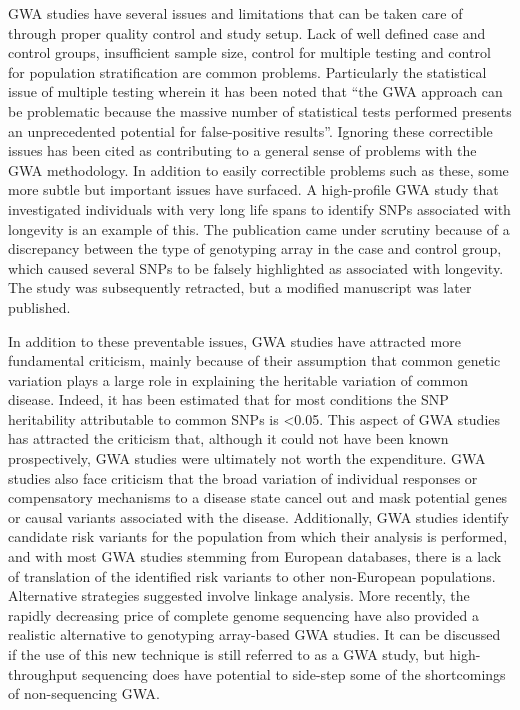 GWA studies have several issues and limitations that can be taken care of through proper quality control and study setup. Lack of well defined case and control groups, insufficient sample size, control for multiple testing and control for population stratification are common problems. Particularly the statistical issue of multiple testing wherein it has been noted that ``the GWA approach can be problematic because the massive number of statistical tests performed presents an unprecedented potential for false-positive results''. Ignoring these correctible issues has been cited as contributing to a general sense of problems with the GWA methodology. In addition to easily correctible problems such as these, some more subtle but important issues have surfaced. A high-profile GWA study that investigated individuals with very long life spans to identify SNPs associated with longevity is an example of this. The publication came under scrutiny because of a discrepancy between the type of genotyping array in the case and control group, which caused several SNPs to be falsely highlighted as associated with longevity. The study was subsequently retracted, but a modified manuscript was later published.

In addition to these preventable issues, GWA studies have attracted more fundamental criticism, mainly because of their assumption that common genetic variation plays a large role in explaining the heritable variation of common disease. Indeed, it has been estimated that for most conditions the SNP heritability attributable to common SNPs is \textless{}0.05. This aspect of GWA studies has attracted the criticism that, although it could not have been known prospectively, GWA studies were ultimately not worth the expenditure. GWA studies also face criticism that the broad variation of individual responses or compensatory mechanisms to a disease state cancel out and mask potential genes or causal variants associated with the disease. Additionally, GWA studies identify candidate risk variants for the population from which their analysis is performed, and with most GWA studies stemming from European databases, there is a lack of translation of the identified risk variants to other non-European populations. Alternative strategies suggested involve linkage analysis. More recently, the rapidly decreasing price of complete genome sequencing have also provided a realistic alternative to genotyping array-based GWA studies. It can be discussed if the use of this new technique is still referred to as a GWA study, but high-throughput sequencing does have potential to side-step some of the shortcomings of non-sequencing GWA.

